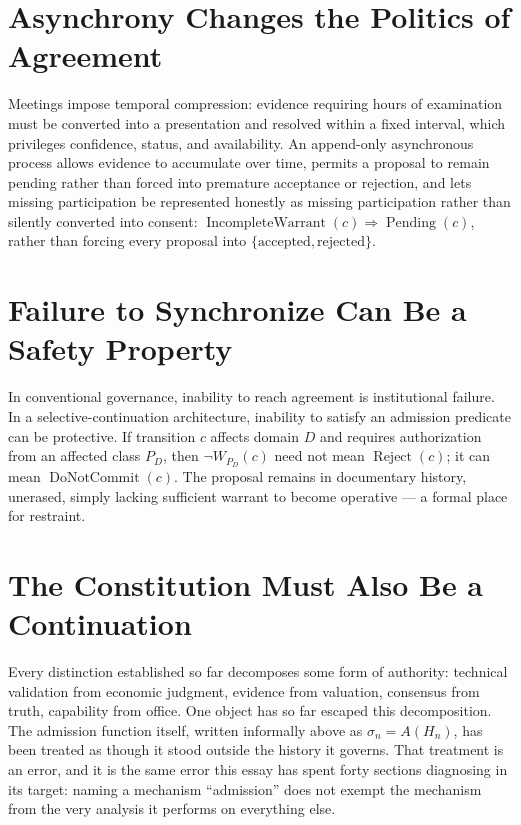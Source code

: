 \documentclass[12pt]{article}
\begin{document}
\section{Asynchrony Changes the Politics of Agreement}

Meetings impose temporal compression: evidence requiring hours of examination must be converted into a presentation and resolved within a fixed interval, which privileges confidence, status, and availability. An append-only asynchronous process allows evidence to accumulate over time, permits a proposal to remain pending rather than forced into premature acceptance or rejection, and lets missing participation be represented honestly as missing participation rather than silently converted into consent: $\operatorname{IncompleteWarrant}(c)\Rightarrow\operatorname{Pending}(c)$, rather than forcing every proposal into $\{\text{accepted},\text{rejected}\}$.

\section{Failure to Synchronize Can Be a Safety Property}

In conventional governance, inability to reach agreement is institutional failure. In a selective-continuation architecture, inability to satisfy an admission predicate can be protective. If transition $c$ affects domain $D$ and requires authorization from an affected class $P_D$, then $\neg W_{P_D}(c)$ need not mean $\operatorname{Reject}(c)$; it can mean $\operatorname{DoNotCommit}(c)$. The proposal remains in documentary history, unerased, simply lacking sufficient warrant to become operative — a formal place for restraint.

\section{The Constitution Must Also Be a Continuation}

Every distinction established so far decomposes some form of authority: technical validation from economic judgment, evidence from valuation, consensus from truth, capability from office. One object has so far escaped this decomposition. The admission function itself, written informally above as $\sigma_n=A(H_n)$, has been treated as though it stood outside the history it governs. That treatment is an error, and it is the same error this essay has spent forty sections diagnosing in its target: naming a mechanism ``admission'' does not exempt the mechanism from the very analysis it performs on everything else.
\end{document}

